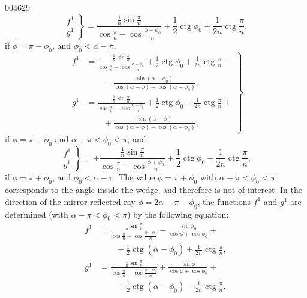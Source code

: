 \begin{scanpage}{0046}{29}
\[\left.\begin{matrix}f^1\\g^1\end{matrix}\right\}=\frac{\frac1n\sin\frac\pi n}{\cos\frac\pi n-\cos\frac{\phi-\phi_0}{n}}+\frac12\operatorname{ctg}\phi_0\pm\frac1{2n}\operatorname{ctg}\frac\pi n,\tag{4.11}\]
if $\phi=\pi-\phi_0$, and $\phi_0<\alpha-\pi$,
\[\left.\begin{aligned}f^1&=\frac{\frac1n\sin\frac\pi n}{\cos\frac\pi n-\cos\frac{\phi-\phi_0}{n}}+\frac12\operatorname{ctg}\phi_0+\frac1{2n}\operatorname{ctg}\frac\pi n-\\&\qquad-\frac{\sin(\alpha-\phi_0)}{\cos(\alpha-\phi)+\cos(\alpha-\phi_0)},\\g^1&=\frac{\frac1n\sin\frac\pi n}{\cos\frac\pi n-\cos\frac{\phi-\phi_0}{n}}+\frac12\operatorname{ctg}\phi_0-\frac1{2n}\operatorname{ctg}\frac\pi n+\\&\qquad+\frac{\sin(\alpha-\phi)}{\cos(\alpha-\phi)+\cos(\alpha-\phi_0)},\end{aligned}\right\}\tag{4.12}\]
if $\phi=\pi-\phi_0$ and $\alpha-\pi<\phi_0<\pi$, and
\[\left.\begin{matrix}f^1\\g^1\end{matrix}\right\}=\mp\frac{\frac1n\sin\frac\pi n}{\cos\frac\pi n-\cos\frac{\phi+\phi_0}{n}}\pm\frac12\operatorname{ctg}\phi_0-\frac1{2n}\operatorname{ctg}\frac\pi n,\tag{4.13}\]
if $\phi=\pi+\phi_0$, and $\phi_0<\alpha-\pi$. The value $\phi=\pi+\phi_0$ with $\alpha-\pi<\phi_0<\pi$ corresponds to the angle inside the wedge, and therefore is not of interest. In the direction of the mirror-reflected ray $\phi=2\alpha-\pi-\phi_0$, the functions $f^1$ and $g^1$ are determined (with $\alpha-\pi<\phi_0<\pi$) by the following equation:
\[\begin{aligned}f^1&=\frac{\frac1n\sin\frac\pi n}{\cos\frac\pi n-\cos\frac{\phi-\phi_0}{n}}-\frac{\sin\phi_0}{\cos\phi+\cos\phi_0}+\\&\qquad+\frac12\operatorname{ctg}(\alpha-\phi_0)+\frac1{2n}\operatorname{ctg}\frac\pi n,\\g^1&=\frac{\frac1n\sin\frac\pi n}{\cos\frac\pi n-\cos\frac{\phi-\phi_0}{n}}+\frac{\sin\phi}{\cos\phi+\cos\phi_0}+\\&\qquad+\frac12\operatorname{ctg}(\alpha-\phi_0)-\frac1{2n}\operatorname{ctg}\frac\pi n.\end{aligned}\tag{4.14}\]
\end{scanpage}
